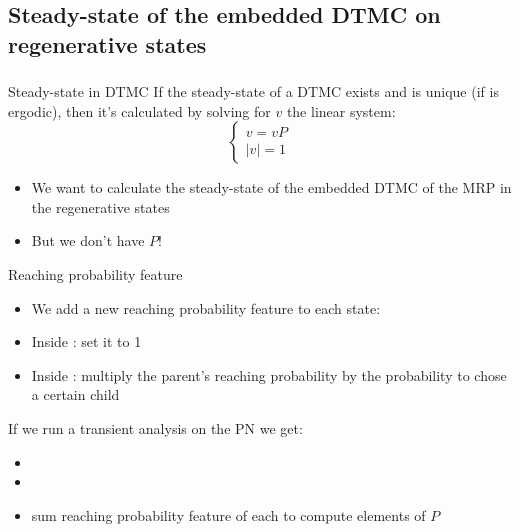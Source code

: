 \subsection{Steady-state of the embedded \acs{DTMC} on regenerative
  states}
\begin{frame}
  \frametitle{\insertsubsection}
  \begin{block}{Steady-state in \acf{DTMC}}
    If the steady-state of a \acf{DTMC} exists and is unique (if is
    ergodic), then it's calculated by solving for $v$ the linear
    system:
    \begin{equation*}
      \begin{cases}
        v=vP\\
        |v| = 1
      \end{cases}
    \end{equation*}
  \end{block}
  \pause
  \begin{itemize}
  \item We want to calculate the steady-state of the embedded \acs{DTMC} of the \acs{MRP} in
    the regenerative states
    \pause
  \item But we don't have $P$! 
  \end{itemize}
\end{frame}

\begin{frame}
  \begin{block}{Reaching probability feature}
    \begin{itemize}
    \item We add a new \alert{reaching probability feature} to each
      state: 
    \item Inside : set it to
      1
    \item Inside : multiply the
      parent's reaching probability by the probability to chose a
      certain child
    \end{itemize}
  \end{block}
  If we run a transient analysis on the \acf{PN} we get:
  \begin{itemize}
  \item {}
  \item {\scriptsize{}}
  \item sum reaching probability feature of each  to compute
    elements of \alert{$P$}
  \end{itemize}
\end{frame}

